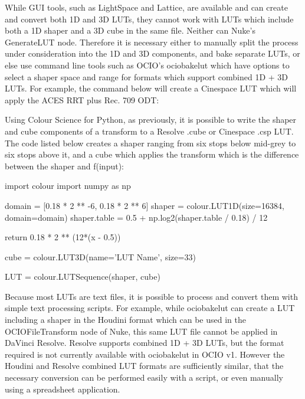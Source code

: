 While GUI tools, such as LightSpace and Lattice, are available and can create and convert both 1D and 3D LUTs, they cannot work with LUTs which include both a 1D shaper and a 3D cube in the same file. Neither can Nuke's GenerateLUT node. Therefore it is necessary either to manually split the process under consideration into the 1D and 3D components, and bake separate LUTs, or else use command line tools such as OCIO's ociobakelut which have options to select a shaper space and range for formats which support combined 1D + 3D LUTs. For example, the command below will create a Cinespace LUT which will apply the ACES RRT plus Rec. 709 ODT:


Using Colour Science for Python, as previously, it is possible to write the shaper and cube components of a transform to a Resolve .cube or Cinespace .csp LUT. The code listed below creates a shaper ranging from six stops below mid-grey to six stops above it, and a cube which applies the transform which is the difference between the shaper and f(input):

import colour
import numpy as np

domain = [0.18 * 2 ** -6, 0.18 * 2 ** 6]
shaper = colour.LUT1D(size=16384, domain=domain)
shaper.table = 0.5 + np.log2(shaper.table / 0.18) / 12

    return 0.18 * 2 ** (12*(x - 0.5))

cube = colour.LUT3D(name='LUT Name', size=33)


LUT = colour.LUTSequence(shaper, cube)

Because most LUTs are text files, it is possible to process and convert them with simple text processing scripts. For example, while ociobakelut can create a LUT including a shaper in the Houdini format which can be used in the OCIOFileTransform node of Nuke, this same LUT file cannot be applied in DaVinci Resolve. Resolve supports combined 1D + 3D LUTs, but the format required is not currently available with ociobakelut in OCIO v1. However the Houdini and Resolve combined LUT formats are sufficiently similar, that the necessary conversion can be performed easily with a script, or even manually using a spreadsheet application.

